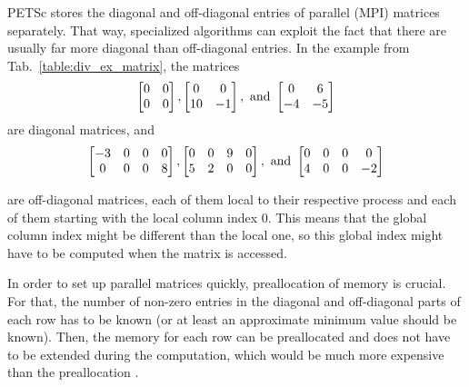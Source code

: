 PETSc stores the diagonal and off-diagonal entries  of parallel (MPI) matrices separately. That way, specialized algorithms can exploit the fact that there are usually far more diagonal than off-diagonal entries.  In the example from Tab.~\ref{table:div_ex_matrix}, the matrices
\begin{align}
\begin{bmatrix}
0 & 0\\
0 & 0\\
\end{bmatrix},
\begin{bmatrix}
0 & 0\\
10 & -1\\
\end{bmatrix}, \textnormal{ and }
\begin{bmatrix}
0 & 6\\
-4 & -5\\
\end{bmatrix}
\label{mat:diag_example}
\end{align}
are diagonal matrices, and 
\begin{align}
\begin{bmatrix}
-3 & 0 & 0 & 0\\
0 & 0 & 0 & 8\\
\end{bmatrix},
\begin{bmatrix}
0 & 0 & 9 & 0\\
5 & 2 & 0 & 0\\
\end{bmatrix}, \textnormal{ and }
\begin{bmatrix}
0 & 0 & 0 & 0\\
4 & 0 & 0 & -2\\
\end{bmatrix}
\label{mat:diag_example}
\end{align}

are off-diagonal matrices, each of them local to their respective process and each of them starting with the local column index 0. This means that the global column index might be different than the local one, so this global index might have to be computed when the matrix is accessed.

In order to set up parallel matrices quickly, preallocation of memory is crucial. For that, the number of non-zero entries in the diagonal and off-diagonal parts of each row has to be known (or at least an approximate minimum value should be known). Then, the memory for each row can be preallocated and does not have to be extended during the computation, which would be much more expensive than the preallocation \cite{petsc-web-page}.




